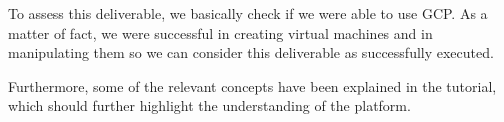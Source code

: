 To assess this deliverable, we basically check if we were able to use
GCP. As a matter of fact, we were successful in creating virtual
machines and in manipulating them so we can consider this deliverable
as successfully executed.

Furthermore, some of the relevant concepts have been explained in the
tutorial, which should further highlight the understanding of the
platform.
